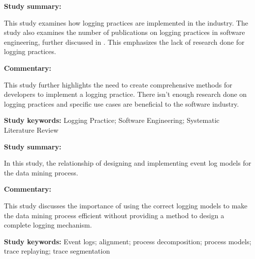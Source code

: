 \clearpage

\begin{tcolorbox}[colback=gray!5!white, colframe=deepblue!80!black, title=A Systematic Review of Logging Practice in Software Engineering\cite{Rong2018}]
	\begin{minipage}[t]{0.25\textwidth}
		\textbf{Study summary:}
	\end{minipage}
	\hfill
	\begin{minipage}[t]{0.65\textwidth}
		This study examines how logging practices are implemented in the industry. The study also examines the number of publications on logging practices in software engineering, further discussed in . This emphasizes the lack of research done for logging practices.
	\end{minipage}

	\vspace{0.75em} 

	\begin{minipage}[t]{0.25\textwidth}
		\textbf{Commentary:}
	\end{minipage}
	\hfill
	\begin{minipage}[t]{0.65\textwidth}
		This study further highlights the need to create comprehensive methods for developers to implement a logging practice. There isn't enough research done on logging practices and specific use cases are beneficial to the software industry. 
	\end{minipage}
	\tcblower
	\textbf{Study keywords:} Logging Practice; Software Engineering; Systematic Literature Review
\end{tcolorbox}

\begin{tcolorbox}[colback=gray!5!white, colframe=deepblue!80!black, title=Efficient Alignment Between Event Logs and Process Models\cite{Song2017}]
	\begin{minipage}[t]{0.25\textwidth}
		\textbf{Study summary:}
	\end{minipage}
	\hfill
	\begin{minipage}[t]{0.65\textwidth}
		In this study, the relationship of designing and implementing event log models for the data mining process.
	\end{minipage}

	\vspace{0.75em} 

	\begin{minipage}[t]{0.25\textwidth}
		\textbf{Commentary:}
	\end{minipage}
	\hfill
	\begin{minipage}[t]{0.65\textwidth}
		This study discusses the importance of using the correct logging models to make the data mining process efficient without providing a method to design a complete logging mechanism.
	\end{minipage}
	\tcblower
	\textbf{Study keywords:} Event logs; alignment; process decomposition; process models; trace replaying; trace segmentation
\end{tcolorbox}

